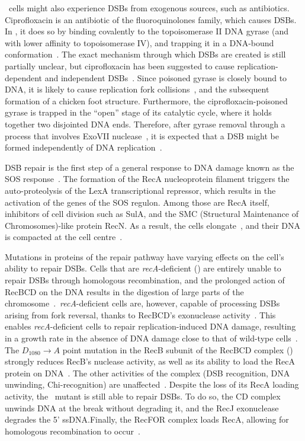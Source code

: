 \ecoli\ cells might also experience DSBs from exo\-genous sources, such as anti\-biotics. Ciprofloxacin is an antibiotic of the fluoro\-quinolones family, which causes DSBs. In \ecoli, it does so by binding covalently to the topoisomerase II DNA gyrase (and with lower affinity to topoisomerase IV), and trapping it in a DNA-bound conformation~\cite{Kohanski2010}. The exact mechanism through which DSBs are created is still partially unclear, but ciprofloxacin has been suggested to cause replication-dependent and independent DSBs~\cite{Ojkic2020}. Since poisoned gyrase is closely bound to DNA, it is likely to cause replication fork collisions~\cite{Wentzell2000, Drlica2008}, and the subsequent formation of a chicken foot structure. Furthermore, the ciprofloxacin-poisoned gyrase is trapped in the ``open'' stage of its catalytic cycle, where it holds together two disjointed DNA ends. Therefore, after gyrase removal through a process that involves ExoVII nuclease~\cite{Huang2021}, it is expected that a DSB might be formed independently of DNA replication~\cite{Zhao2006}.

DSB repair is the first step of a general response to DNA damage known as the SOS response~\cite{Baharoglu2014}. The formation of the RecA nucleoprotein filament triggers the auto-proteolysis of the LexA transcriptional repressor, which results in the activation of the genes of the SOS regulon. Among those are RecA itself, inhibitors of cell division such as SulA, and the SMC (Structural Maintenance of Chromosomes)-like protein RecN. As a result, the cells elongate~\cite{Bos2015}, and their DNA is compacted at the cell centre~\cite{Odsbu2014}.

Mutations in proteins of the repair pathway have varying effects on the cell's ability to repair DSBs. Cells that are \emph{recA}-deficient (\dreca) are entirely unable to repair DSBs through homologous recombination, and the prolonged action of RecBCD on the DNA results in the digestion of large parts of the chromosome~\cite{Horii1968,Chow2007}.\ \emph{recA}-deficient cells are, however, capable of processing DSBs arising from fork reversal, thanks to RecBCD's exonuclease activity~\cite{Seigneur1998, Michel2001}. This enables \emph{recA}-deficient cells to repair replication-induced DNA damage, resulting in a growth rate in the absence of DNA damage close to that of wild-type cells~\cite{delVal2021}. The $D_{1080} \rightarrow A$ point mutation in the RecB subunit of the RecBCD complex (\teneighty) strongly reduces RecB's nuclease activity, as well as its ability to load the RecA protein on DNA~\cite{Yu1998, Wang2000}. The other activities of the complex (DSB recognition, DNA unwinding, Chi-recognition) are unaffected~\cite{Anderson1999}. Despite the loss of its RecA loading activity, the \geneteneighty\ mutant is still able to repair DSBs. To do so, the {\teneighty}CD complex unwinds DNA at the break without degrading it, and the RecJ exonuclease degrades the 5' ssDNA.\@ Finally, the RecFOR complex loads RecA, allowing for homologous recombination to occur~\cite{Ivancic-Bace_2003}.

